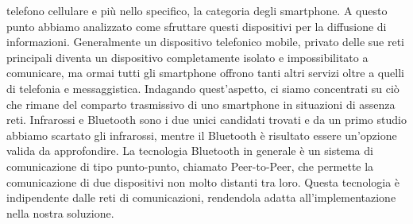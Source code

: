 telefono cellulare e più nello specifico, la categoria degli smartphone. A questo punto abbiamo analizzato come sfruttare questi dispositivi per la diffusione di informazioni. Generalmente un dispositivo telefonico mobile, privato delle sue reti principali diventa un dispositivo completamente isolato e impossibilitato a comunicare, ma ormai tutti gli smartphone offrono tanti altri servizi oltre a quelli di telefonia e messaggistica. Indagando quest'aspetto, ci siamo concentrati su ciò che rimane del comparto trasmissivo di uno smartphone in situazioni di assenza reti. Infrarossi e Bluetooth sono i due unici candidati trovati e da un primo studio abbiamo scartato gli infrarossi, mentre il Bluetooth è risultato essere un'opzione valida da approfondire. La tecnologia Bluetooth in generale è un sistema di comunicazione di tipo punto-punto, chiamato Peer-to-Peer, che permette la comunicazione di due dispositivi non molto distanti tra loro. Questa tecnologia è indipendente dalle reti di comunicazioni, rendendola adatta all'implementazione nella nostra soluzione.

